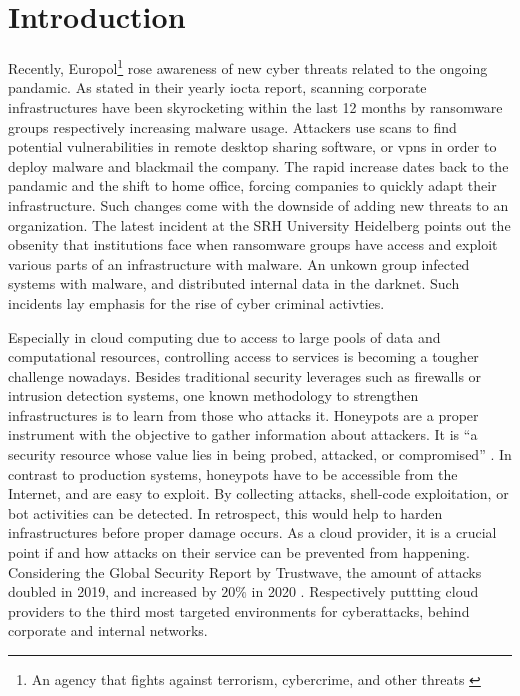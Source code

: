 \chapter{Introduction}

Recently, Europol\footnote{An agency that fights against terrorism, cybercrime, and other threats \cite{europol2021}} rose awareness of new cyber threats related to the ongoing pandamic.
As stated in their yearly \ac{iocta} report, scanning corporate infrastructures have been skyrocketing within the last 12 months by ransomware groups respectively increasing malware usage.
Attackers use scans to find potential vulnerabilities in remote desktop sharing software, or \acp{vpn} in order to deploy malware and blackmail the company. \cite{iocta2020}
The rapid increase dates back to the pandamic and the shift to home office, forcing companies to quickly adapt their infrastructure.
Such changes come with the downside of adding new threats to an organization.
The latest incident at the SRH University Heidelberg points out the obsenity that institutions face when ransomware groups have access and exploit various parts of an infrastructure with malware.
An unkown group infected systems with malware, and distributed internal data in the darknet.
Such incidents lay emphasis for the rise of cyber criminal activties.

Especially in cloud computing due to access to large pools of data and computational resources, controlling access to services is becoming a tougher challenge nowadays.
Besides traditional security leverages such as firewalls or intrusion detection systems, one known methodology to strengthen infrastructures is to learn from those who attacks it.
Honeypots are a proper instrument with the objective to gather information about attackers.
It is \enquote{a security resource whose value lies in being probed, attacked, or compromised} \cite{Spitzner2003}.
In contrast to production systems, honeypots have to be accessible from the Internet, and are easy to exploit. 
By collecting attacks, shell-code exploitation, or bot activities can be detected.
In retrospect, this would help to harden infrastructures before proper damage occurs.
As a cloud provider, it is a crucial point if and how attacks on their service can be prevented from happening.
Considering the Global Security Report by Trustwave, the amount of attacks doubled in 2019, and increased by $20\%$ in 2020 \cite{fahim2020}.
Respectively puttting cloud providers to the third most targeted environments for cyberattacks, behind corporate and internal networks.

